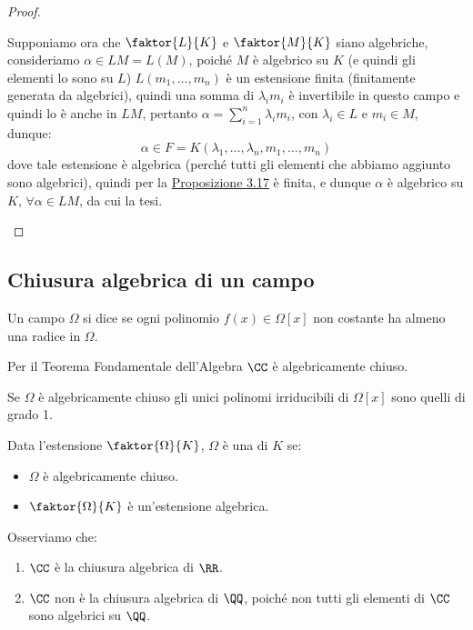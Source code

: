 \documentclass[11pt]{scrartcl}
\begin{document}
\begin{proof}
\begin{enumerate}[(1)]
        Supponiamo ora che $\faktor{L}{K}$ e $\faktor{M}{K}$ siano algebriche, consideriamo $\alpha \in LM = L(M)$, poiché $M$ è algebrico su $K$ (e quindi gli elementi lo sono su $L$)  $L(m_1,\ldots,m_n)$ è un estensione finita (finitamente generata da algebrici), quindi una somma di $ \lambda_i m_i$ è invertibile in questo campo e quindi
        lo è anche in $LM$, pertanto $\alpha = \sum_{i=1}^{n} \lambda_i m_i$, con $\lambda_i \in L$ e $m_i \in M$, dunque:
         \[ \alpha \in F = K(\lambda_1,\ldots,\lambda_n,m_1,\ldots,m_n)
            \]
        dove tale estensione è algebrica (perché tutti gli elementi che abbiamo aggiunto sono algebrici), quindi per la \hyperref[3.17]{Proposizione 3.17} è finita,
        e dunque $\alpha$ è algebrico su $K$, $\forall \alpha \in LM$, da cui la tesi.
    \end{enumerate}
\end{proof}

\newpage
\subsection{Chiusura algebrica di un campo}
\begin{definition}
    Un campo $\Omega$ si dice  se ogni polinomio $f(x) \in \Omega[x]$ non costante ha almeno una radice in $\Omega$.
\end{definition}

\begin{example}
    Per il Teorema Fondamentale dell'Algebra $\CC$ è algebricamente chiuso.
\end{example}

\begin{remark}
    Se $\Omega$ è algebricamente chiuso gli unici polinomi irriducibili di $\Omega[x]$ sono quelli di grado 1.
\end{remark}

\begin{definition}
    Data l'estensione $\faktor{\Omega}{K}$, $\Omega$ è una  di $K$ se:
    \begin{itemize}
        \item $\Omega$ è algebricamente chiuso.
        \item $\faktor{\Omega}{K}$ è un'estensione algebrica.
    \end{itemize}
\end{definition}

\begin{example}
    Osserviamo che:
    \begin{enumerate}[(1)]
        \item $\CC$ è la chiusura algebrica di $\RR$.
        \item $\CC$ non è la chiusura algebrica di $\QQ$, poiché non tutti gli elementi di $\CC$ sono algebrici su $\QQ$.
    \end{enumerate}
\end{example}
\end{document}

